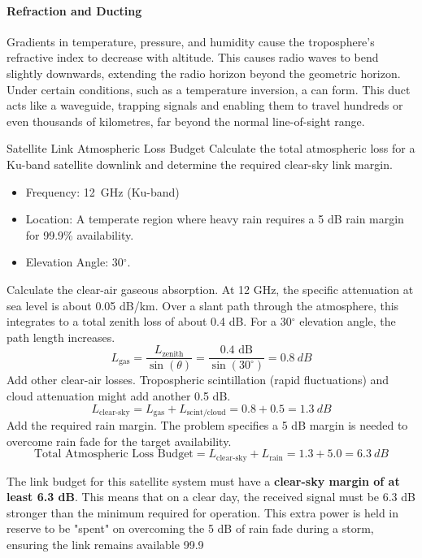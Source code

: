 \paragraph{Refraction and Ducting}
Gradients in temperature, pressure, and humidity cause the troposphere's refractive index to decrease with altitude. This causes radio waves to bend slightly downwards, extending the radio horizon beyond the geometric horizon. Under certain conditions, such as a temperature inversion, a  can form. This duct acts like a waveguide, trapping signals and enabling them to travel hundreds or even thousands of kilometres, far beyond the normal line-of-sight range.


\begin{workedexample}{Satellite Link Atmospheric Loss Budget}
     Calculate the total atmospheric loss for a Ku-band satellite downlink and determine the required clear-sky link margin.
    \begin{itemize}
        \item Frequency: \qty{12}{GHz} (Ku-band)
        \item Location: A temperate region where heavy rain requires a 5 dB rain margin for 99.9\% availability.
        \item Elevation Angle: 30$^\circ$.
    \end{itemize}
    \begin{derivationsteps}
        \step Calculate the clear-air gaseous absorption. At 12 GHz, the specific attenuation at sea level is about 0.05 dB/km. Over a slant path through the atmosphere, this integrates to a total zenith loss of about 0.4 dB. For a 30$^\circ$ elevation angle, the path length increases.
        \[ L_{\text{gas}} = \frac{L_{\text{zenith}}}{\sin(\theta)} = \frac{0.4 \text{ dB}}{\sin(30^\circ)} = \qty{0.8}{dB} \]
        \step Add other clear-air losses. Tropospheric scintillation (rapid fluctuations) and cloud attenuation might add another 0.5 dB.
        \[ L_{\text{clear-sky}} = L_{\text{gas}} + L_{\text{scint/cloud}} = 0.8 + 0.5 = \qty{1.3}{dB} \]
        \step Add the required rain margin. The problem specifies a 5 dB margin is needed to overcome rain fade for the target availability.
        \[ \text{Total Atmospheric Loss Budget} = L_{\text{clear-sky}} + L_{\text{rain}} = 1.3 + 5.0 = \qty{6.3}{dB} \]
    \end{derivationsteps}
     The link budget for this satellite system must have a \textbf{clear-sky margin of at least 6.3 dB}. This means that on a clear day, the received signal must be 6.3 dB stronger than the minimum required for operation. This extra power is held in reserve to be "spent" on overcoming the 5 dB of rain fade during a storm, ensuring the link remains available 99.9%
\end{workedexample}

